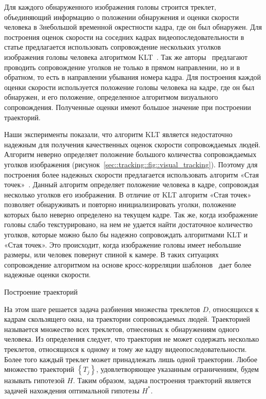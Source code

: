Для каждого обнаруженного изображения головы строится треклет, объединяющий информацию о положении обнаружения и оценки скорости человека в 3небольшой временной окрестности кадра, где он был обнаружен. Для построения оценок скорости на соседних кадрах видеопоследовательности в статье \cite{benfold2011stable} предлагается использовать сопровождение нескольких уголков \cite{shi1994good} изображения головы человека алгоритмом KLT~\cite{tomasi1991detection}. Так же авторы~\cite{benfold2011stable} предлагают проводить сопровождение уголков не только в прямом направлении, но и в обратном, то есть в направлении убывания номера кадра. Для построения каждой оценки скорости используется положение головы человека на кадре, где он был обнаружен, и его положение, определенное алгоритмом визуального сопровождения. Полученные оценки имеют большое значение при построении траекторий.

Наши эксперименты показали, что алгоритм KLT является недостаточно надежным для получения качественных оценок скорости сопровождаемых людей. Алгоритм неверно определяет положение большого количества сопровождаемых уголков изображения (рисунок~\ref{sec::tracking::fig::visual_tracking}). Поэтому для построения более надежных скорости предлагается использовать алгоритм «Стая точек»~\cite{kolsch2004fast}. Данный алгоритм определяет положение человека в кадре, сопровождая несколько уголков его изображения. В отличие от KLT алгоритм «Стая точек» позволяет обнаруживать и повторно инициализировать уголки, положение которых было неверно определено на текущем кадре. Так же, когда изображение головы слабо текстурировано, на нем не удается найти достаточное количество уголков, которые можно было бы надежно сопровождать алгоритмами KLT и «Стая точек». Это происходит, когда изображение головы имеет небольшие размеры, или человек повернут спиной к камере. В таких ситуациях сопровождение алгоритмом на основе кросс-корреляции шаблонов~\cite{freeman1998computer} дает более надежные оценки скорости.

Построение траекторий

На этом шаге решается задача разбиения множества треклетов $D$, относящихся к кадрам скользящего окна, на траектории сопровождаемых людей. Траекторией называется множество всех треклетов, отнесенных к обнаружениям одного человека. Из определения следует, что траектория не может содержать несколько треклетов, относящихся к одному и тому же кадру видеопоследовательности. Более того каждый треклет может принадлежать лишь одной траектории. Любое множество траекторий $\left\{T_j\right\}$, удовлетворяющее указанным ограничениям, будем называть гипотезой $H$. Таким образом, задача построения траекторий является задачей нахождения оптимальной гипотезы $H^*$.

